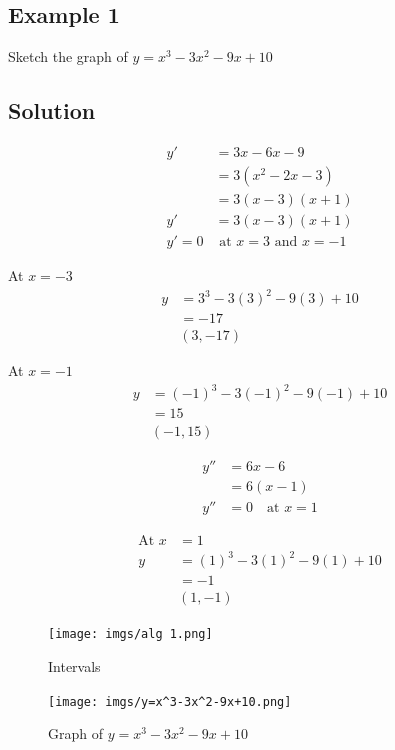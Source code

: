 \documentclass{article}
\begin{document}
\subsection*{Example 1}
Sketch the graph of $y=x^3-3x^2-9x+10$
\subsection*{Solution}
\begin{align*}
    y' &= 3x - 6x - 9 \\
    &= 3(x^2 - 2x - 3) \\
    &= 3(x - 3)(x + 1) \\
    y' &= 3(x - 3)(x + 1) \\
    y' = 0 & \text{ at } x = 3 \text{ and } x = -1
\end{align*}
\begin{minipage}{0.5\linewidth}
At $x=-3$ 
\begin{align*}
    y&=3^3-3(3)^2-9(3)+10\\
    &=-17\\
    &(3,-17)
\end{align*}
\end{minipage}
\begin{minipage}{0.5\linewidth}
At $x=-1$ 
\begin{align*}
    y&=(-1)^3-3(-1)^2-9(-1)+10\\
    &=15\\
    &(-1,15)
\end{align*}
\end{minipage}
\begin{minipage}{0.5\linewidth}
\begin{align*}
    y'' &= 6x - 6 \\
    &= 6(x - 1) \\
    y'' &= 0 \quad \text{at } x = 1
\end{align*}
\end{minipage}
\begin{minipage}{0.5\linewidth}
\begin{align*}
\text{At } x &= 1 \\
y &= (1)^3 - 3(1)^2 - 9(1) + 10 \\
&= -1 \\
&(1, -1)
\end{align*}
\end{minipage}
\begin{figure}[h]
    \centering
    \begin{minipage}{0.5\textwidth}
        \centering
        \texttt{[image: imgs/alg 1.png]}
        \caption{Intervals}
        \label{fig:alg1}
    \end{minipage}%
    \begin{minipage}{0.5\textwidth}
        \centering
        \texttt{[image: imgs/y=x^3-3x^2-9x+10.png]}
        \caption{Graph of $y=x^3-3x^2-9x+10$}
        \label{fig:graph}
    \end{minipage}
\end{figure}
\newpage 
\end{document}
